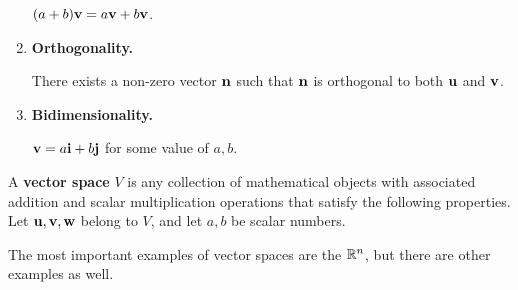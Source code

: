 \begin{applicationActivities}
\begin{activity}{20}
\begin{multicols}{2}
\begin{enumerate}
        \((a+b)\mathbf v=a\mathbf v+b\mathbf v\).
  \item \textbf{Orthogonality.}

        There exists a non-zero vector \(\mathbf n\) such that
        \(\mathbf n\) is orthogonal to both \(\mathbf u\) and \(\mathbf v\).
  \item \textbf{Bidimensionality.}

        \(\mathbf v=a\mathbf i+b\mathbf j\) for some value of \(a,b\).
\end{enumerate}
\end{multicols}
\end{activity}

\begin{definition}
  A \textbf{vector space} \(V\) is any collection of mathematical objects with
  associated addition and scalar multiplication operations that satisfy
  the following properties. Let \(\mathbf u,\mathbf v,\mathbf w\) belong to \(V\),
  and let \(a,b\) be scalar numbers.

  \vectorSpaceProperties
\end{definition}

\begin{definition}
  The most important examples of vector spaces are the  \(\mathbb{R}^n\), but there are other examples as well.
\end{definition}


\end{applicationActivities}
